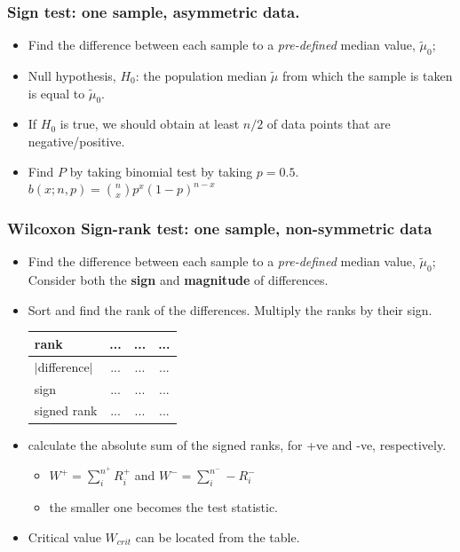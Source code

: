 \documentclass{article}
\begin{document}
\subsubsection{Sign test: \footnotesize{one sample, asymmetric data.}}
 \begin{itemize}
        \item Find the difference between each sample to a \textit{pre-defined} median value, $\tilde{\mu}_{0}$;
        \item Null hypothesis, $H_{0}$: the population median $\tilde{\mu}$ from which the sample is taken is equal to $\tilde{\mu}_{0}$.
        \item If $H_{0}$ is true, we should obtain at least $n/2$ of data points that are negative/positive.   
        \item Find $P$ by taking binomial test by taking $p=0.5$.  $\displaystyle b(x;n,p) ={ n \choose x} p^{x}(1-p)^{n-x}$
 \end{itemize}
\subsubsection{Wilcoxon Sign-rank test: \footnotesize{one sample, non-symmetric data}}
\begin{itemize}
    \item Find the difference between each sample to a \textit{pre-defined} median value, $\tilde{\mu}_{0}$; Consider both the \textbf{sign} and \textbf{magnitude} of differences.
        \item Sort and find the rank of the differences. Multiply the ranks by their sign. 
        \begin{table}[H]
            \centering
            \begin{tabular}{l|c|c|c}
            rank  &  ...  &  ...&  ...\\ \hline
            $\lvert$difference$\rvert$ & ...  &  ...&  ...\\  \hline
            sign & ...  &  ...&  ...\\ \hline
            signed rank & ... &  ... &  ...\\ 
            \end{tabular}
        \end{table}
        \item calculate the absolute sum of the signed ranks, for +ve and -ve, respectively.
        \begin{itemize}
            \item $W^{+} = \sum_{i}^{n^{+}}R_{i}^{+}$ and $W^{-} = \sum_{i}^{n^{-}}-R_{i}^{-}$
            \item the smaller one becomes the test statistic.
        \end{itemize}
        \item Critical value $W_{crit}$ can be located from the table. 
\end{itemize}
\end{document}
